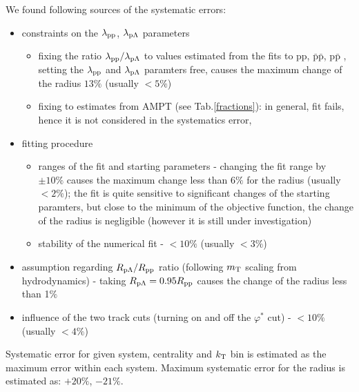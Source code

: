 We found following sources of the systematic errors:%
\begin{itemize}
\item constraints on the $\lambda_{\rm \rm pp}$, $\lambda_{\rm p\Lambda}$ parameters %
  \begin{itemize}
  \item fixing the ratio $\lambda_{\rm pp} / \lambda_{\rm p\Lambda}$ to values estimated from the fits to pp, $\bar{\mathrm{p}}$$\bar{\mathrm{p}}$, p$\bar{\mathrm{p}}$ , setting the $\lambda_{\rm pp}$ and $\lambda_{\rm p\Lambda}$ paramters free, causes the maximum change of the radius $13\%$ (usually $<5\%$)
  \item fixing to estimates from AMPT (see Tab.\ref{fractions}): in general, fit fails, hence it is not considered in the systematics error,
  \end{itemize}
\item fitting procedure
  \begin{itemize}
  \item ranges of the fit and starting parameters - changing the fit range by $\pm10\%$ causes the maximum change less than $6\%$ for the radius (usually $<2\%$); the fit is quite sensitive to significant changes of the starting paramters, but close to the minimum of the objective function, the change of the radius is negligible (however it is still under investigation)%
  \item stability of the numerical fit - $<10\%$ (usually $<3\%$)
  \end{itemize}
\item assumption regarding $R_{\rm p\Lambda}/R_{\rm pp}$ ratio (following $m_{\rm \mathrm{T}}$ scaling from hydrodynamics) - taking $R_{\rm p\Lambda}=0.95R_{\rm pp}$ causes the change of the radius less than 1$\%$
\item influence of the two track cuts (turning on and off the $\varphi^*$ cut) - $<10\%$ (usually $<4\%$)
\end{itemize}
Systematic error for given system, centrality and $k_{\rm \mathrm{T}}$ bin is estimated as the maximum error within each system. Maximum systematic error for the radius is estimated as: $+20\%$, $-21\%$.

